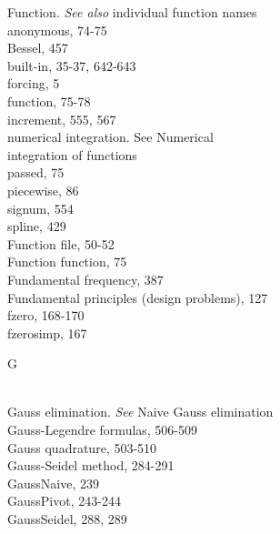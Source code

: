 \documentclass[../main.tex]{subfiles}
\begin{document}
\begin{multicols}{3}
    Function. \textit{See also} individual function names\\
    \hspace*{3mm}anonymous, 74-75\\
    \hspace*{3mm}Bessel, 457\\
    \hspace*{3mm}built-in, 35-37, 642-643\\
    \hspace*{3mm}forcing, 5\\
    \hspace*{3mm}function, 75-78\\
    \hspace*{3mm}increment, 555, 567\\
    \hspace*{3mm}numerical integration. See Numerical\\
    \hspace*{3mm}integration of functions\\
    \hspace*{3mm}passed, 75\\
    \hspace*{3mm}piecewise, 86\\
    \hspace*{3mm}signum, 554\\
    \hspace*{3mm}spline, 429\\
    Function file, 50-52\\
    Function function, 75\\
    Fundamental frequency, 387\\
    Fundamental principles (design problems), 127\\
    fzero, 168-170\\
    fzerosimp, 167\vspace*{2mm}\\
    \begin{huge} G \end{huge}\\
    Gauss elimination. \textit{See} Naive Gauss elimination\\
    Gauss-Legendre formulas, 506-509\\
    Gauss quadrature, 503-510\\
    Gauss-Seidel method, 284-291\\
    GaussNaive, 239\\
    GaussPivot, 243-244\\
    GaussSeidel, 288, 289\\

\end{multicols}
\end{document}
